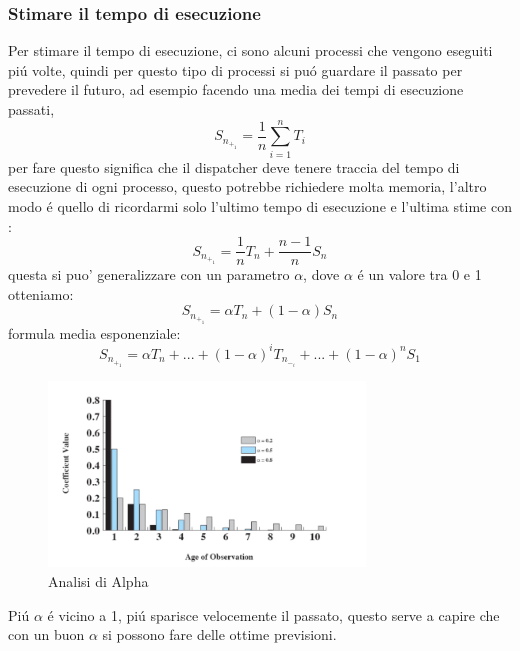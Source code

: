     \subsubsection*{Stimare il tempo di esecuzione}
    Per stimare il tempo di esecuzione, ci sono alcuni processi che vengono eseguiti piú volte,
    quindi per questo tipo di processi si puó guardare il passato per prevedere il futuro, ad esempio facendo una
    media dei tempi di esecuzione passati,
    \begin{equation}
    S_n_+_1 = \frac{1}{n} \sum_{i=1}^{n} T_i\label{eq:Media dei tempi di esecuzione}
    \end{equation}
    per fare questo significa che il dispatcher deve tenere traccia del tempo di esecuzione di ogni processo, questo
    potrebbe richiedere molta memoria, l'altro modo é quello di ricordarmi solo l'ultimo tempo di esecuzione e l'ultima
    stime con :
    \begin{equation}
        S_n_+_1 = \frac{1}{n}T_n + \frac{n-1}{n}S_n\label{eq:Mi ricordo solo l'ultimo tempo di esecuzione e l'ultima stima}
    \end{equation}
    questa si puo' generalizzare con un parametro $\alpha$, dove $\alpha$ é un valore tra 0 e 1 otteniamo:
    \begin{equation}
        S_n_+_1 = \alpha T_n + (1-\alpha)S_n\label{eq:formula con $\alpha$}
    \end{equation}
    formula media esponenziale:
    \begin{equation}
        S_n_+_1 = \alpha T_n + ... + (1-\alpha)^iT_n_-_i +...+ (1-\alpha)^nS_1\label{eq: Exponential Averaging }
    \end{equation}
    \begin{figure}
        \centering
        \includegraphics[width=0.75\textwidth]{immagini/AnalisiDiAlphaSpn}
        \caption{Analisi di Alpha}
    \end{figure}
    Piú $\alpha$ é vicino a 1, piú sparisce velocemente il passato, questo serve a capire che con un buon $\alpha$ si 
    possono fare delle ottime previsioni.
